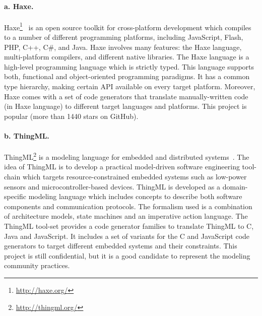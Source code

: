 \paragraph{a. Haxe.} 	Haxe\footnote{\url{http://haxe.org/}}~\cite{dasnois2011haxe} is an open source toolkit for cross-platform development which compiles to a number of different programming platforms, including JavaScript, Flash, PHP, C++, C\#, and Java. Haxe involves many features: the Haxe language, multi-platform compilers, and different native libraries. The Haxe language is a high-level programming language which is strictly typed. This language supports both, functional and object-oriented programming paradigms. It has a common type hierarchy, making certain API available on every target platform. Moreover, Haxe comes with a set of code generators that translate manually-written code (in Haxe language) to different target languages and platforms.  
This project is popular (more than \num{1440} stars on GitHub).

\paragraph{b. ThingML.} ThingML\footnote{\url{http://thingml.org/}} is a modeling language for embedded and distributed systems~\cite{fleurey2011mde}. The idea of ThingML is to develop a practical model-driven software engineering tool-chain which targets resource-constrained embedded systems such as low-power sensors and microcontroller-based devices. ThingML is developed as a domain-specific modeling language which includes concepts to describe both software components and communication protocols. The formalism used is a combination of architecture models, state machines and an imperative action language. The ThingML tool-set provides a  code generator families  to translate ThingML to C, Java and JavaScript. It includes a set of variants for the C and JavaScript code generators to target different embedded systems and their constraints. 
This project is still confidential, but it is a good candidate to represent the modeling community practices.

